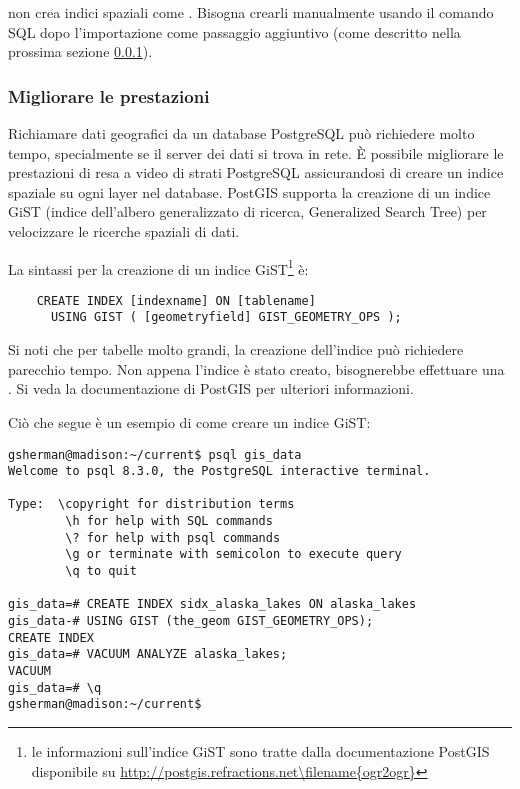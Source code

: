  non crea indici spaziali come . Bisogna
crearli manualmente usando il comando SQL  dopo
l'importazione come passaggio aggiuntivo (come descritto nella prossima
sezione \ref{label_improve}).

\subsubsection{Migliorare le prestazioni} \label{label_improve}

Richiamare dati geografici da un database PostgreSQL può richiedere molto
tempo, specialmente se il server dei dati si trova in rete. È possibile
migliorare le prestazioni di resa a video di strati PostgreSQL assicurandosi
di creare un  indice spaziale su ogni layer nel
database. PostGIS supporta la creazione di un  indice GiST
(indice dell'albero generalizzato di ricerca, Generalized Search Tree) per
velocizzare le ricerche spaziali di dati.

La sintassi per la creazione di un indice GiST\footnote{le informazioni sull'indice
GiST sono tratte dalla documentazione PostGIS disponibile su
\url{http://postgis.refractions.net\filename{ogr2ogr}}} è:

\begin{verbatim}
    CREATE INDEX [indexname] ON [tablename] 
      USING GIST ( [geometryfield] GIST_GEOMETRY_OPS );
\end{verbatim}

Si noti che per tabelle molto grandi, la creazione dell'indice può richiedere
parecchio tempo. Non appena l'indice è stato creato, bisognerebbe effettuare
una . Si veda la documentazione di PostGIS
\cite{PostGISweb} per ulteriori informazioni.

Ciò che segue è un esempio di come creare un indice GiST:
\begin{verbatim}
gsherman@madison:~/current$ psql gis_data
Welcome to psql 8.3.0, the PostgreSQL interactive terminal.

Type:  \copyright for distribution terms
        \h for help with SQL commands
        \? for help with psql commands
        \g or terminate with semicolon to execute query
        \q to quit

gis_data=# CREATE INDEX sidx_alaska_lakes ON alaska_lakes
gis_data-# USING GIST (the_geom GIST_GEOMETRY_OPS);
CREATE INDEX
gis_data=# VACUUM ANALYZE alaska_lakes;
VACUUM
gis_data=# \q
gsherman@madison:~/current$
\end{verbatim}

